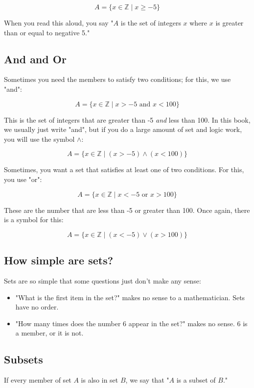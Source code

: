 $$A = \{ x \in \mathbb{Z} \mid x \geq -5 \}$$

When you read this aloud, you say "$A$ is the set of integers $x$
where $x$ is greater than or equal to negative 5."

\subsection{And and Or}

Sometimes you need the members to satisfy two conditions; for this, we
use "and": 

$$A = \{ x \in \mathbb{Z} \mid x > -5 \text{ and }  x < 100\}$$

This is the set of integers that are greater than -5 \textit{and} less
than 100.  In this book, we usually just write "and", but if you do a
large amount of set and logic work, you will use the symbol $\land$:

$$A = \{ x \in \mathbb{Z} \mid (x > -5) \land (x < 100)\}$$

Sometimes, you want a set that satisfies at least one of two
conditions.  For this, you use "or":

$$A = \{ x \in \mathbb{Z} \mid x < -5 \text{ or } x > 100\}$$

These are the number that are less than -5 or greater than 100.  Once
again, there is a symbol for this:

$$A = \{ x \in \mathbb{Z} \mid (x < -5) \lor (x > 100)\}$$

\subsection{How simple are sets?}

Sets are so simple that some questions just don't make any sense:
\begin{itemize}
\item "What is the first item in the set?" makes no sense to a mathematician.  Sets have no order.
\item "How many times does the number 6 appear in the set?"  makes no sense.   6 is a member, or it is not.   
\end{itemize}

\subsection{Subsets}

If every member of set $A$ is also in set $B$, we say that "$A$ is a
subset of $B$." 

